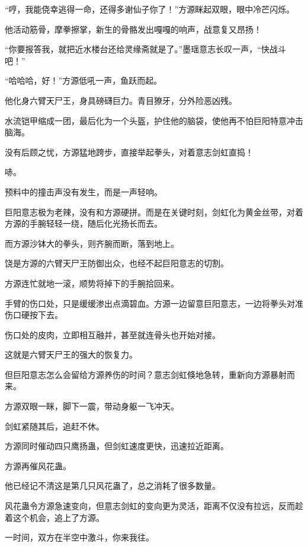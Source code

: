 
\begin{this_body}



“哼，我能侥幸逃得一命，还得多谢仙子你了！”方源眯起双眼，眼中冷芒闪烁。

他活动筋骨，摩拳擦掌，新生的骨骼发出嘎嘎的响声，战意复又昂扬！

“你要报答我，就把近水楼台还给灵缘斋就是了。”墨瑶意志长叹一声，“快战斗吧！”

“哈哈哈，好！”方源低吼一声，鱼跃而起。

他化身六臂天尸王，身具磅礴巨力。青目獠牙，分外险恶凶残。

水流铠甲缩成一团，最后化为一个头盔，护住他的脑袋，使他再不怕巨阳特意冲击脑海。

没有后顾之忧，方源猛地跨步，直接举起拳头，对着意志剑虹直捣！

哧。

预料中的撞击声没有发生，而是一声轻响。

巨阳意志极为老辣，没有和方源硬拼。而是在关键时刻，剑虹化为黄金丝带，对着方源的手腕轻轻一绕，随后化光扬长而去。

而方源沙钵大的拳头，则齐腕而断，落到地上。

饶是方源的六臂天尸王防御出众，也经不起巨阳意志的切割。

方源连忙就地一滚，顺势将掉下的手腕拾回来。

手臂的伤口处，只是缓缓渗出点滴碧血。方源一边留意巨阳意志，一边将拳头对准伤口硬按下去。

伤口处的皮肉，立即相互融并，甚至就连骨头也开始对接。

这就是六臂天尸王的强大的恢复力。

但巨阳意志怎么会留给方源养伤的时间？意志剑虹倏地急转，重新向方源暴射而来。

方源双眼一眯，脚下一震，带动身躯一飞冲天。

剑虹紧随其后，追赶不休。

方源同时催动四只鹰扬蛊，但剑虹速度更快，迅速拉近距离。

方源再催风花蛊。

他已经记不清这是第几只风花蛊了，总之消耗了很多数量。

风花蛊令方源急速变向，但意志剑虹的变向更为灵活，距离不仅没有拉远，反而趁着这个机会，追上了方源。

一时间，双方在半空中激斗，你来我往。


\end{this_body}
